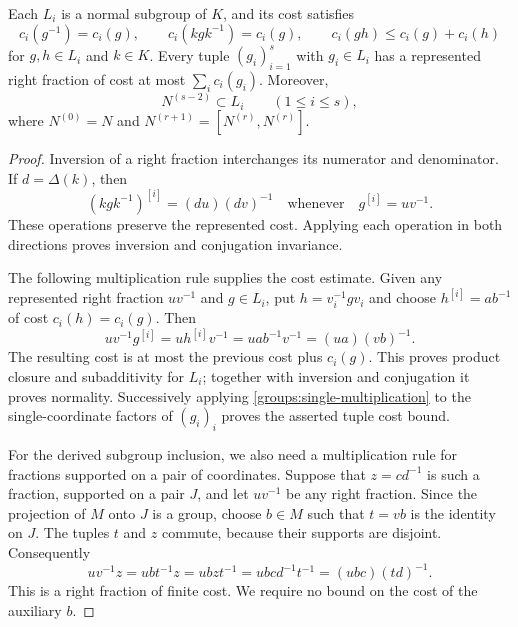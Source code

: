 \begin{lemma}\label{groups:fractions}
Each $L_i$ is a normal subgroup of $K$, and its cost satisfies
\[
 c_i(g^{-1})=c_i(g),\qquad
 c_i(kgk^{-1})=c_i(g),\qquad
 c_i(gh)\le c_i(g)+c_i(h)
\]
for $g,h\in L_i$ and $k\in K$.
Every tuple $(g_i)_{i=1}^s$ with $g_i\in L_i$ has a represented
right fraction of cost at most $\sum_i c_i(g_i)$.
Moreover,
\begin{equation}\label{groups:derived-inclusion}
 N^{(s-2)}\subset L_i\qquad(1\le i\le s),
\end{equation}
where $N^{(0)}=N$ and $N^{(r+1)}=[N^{(r)},N^{(r)}]$.
\end{lemma}
\begin{proof}
Inversion of a right fraction interchanges its numerator and denominator.
If $d=\Delta(k)$, then
\[
 (kgk^{-1})^{[i]}=(du)(dv)^{-1}
 \quad\text{whenever}\quad g^{[i]}=uv^{-1}.
\]
These operations preserve the represented cost.  Applying each operation
in both directions proves inversion and conjugation invariance.

The following multiplication rule supplies the cost estimate.  Given
any represented right fraction $uv^{-1}$ and $g\in L_i$, put
$h=v_i^{-1}gv_i$ and choose $h^{[i]}=ab^{-1}$ of cost $c_i(h)=c_i(g)$.
Then
\begin{equation}\label{groups:single-multiplication}
 uv^{-1}g^{[i]}
   =u h^{[i]}v^{-1}
   =ua b^{-1}v^{-1}
   =(ua)(vb)^{-1}.
\end{equation}
The resulting cost is at most the previous cost plus $c_i(g)$.
This proves product closure and subadditivity for $L_i$; together with
inversion and conjugation it proves normality.  Successively applying
\eqref{groups:single-multiplication} to the single-coordinate factors of
$(g_i)_i$ proves the asserted tuple cost bound.

For the derived subgroup inclusion, we also need a multiplication rule
for fractions supported on a pair of coordinates.  Suppose that
$z=cd^{-1}$ is such a fraction, supported on a pair $J$, and let
$uv^{-1}$ be any right fraction.  Since the projection of $M$ onto $J$
is a group, choose $b\in M$ such that $t=vb$ is the identity on $J$.
The tuples $t$ and $z$ commute, because their supports are disjoint.
Consequently
\begin{equation}\label{groups:pair-multiplication}
 uv^{-1}z
   =ubt^{-1}z
   =ubzt^{-1}
   =ubc d^{-1}t^{-1}
   =(ubc)(td)^{-1}.
\end{equation}
This is a right fraction of finite cost.  We require no bound on the
cost of the auxiliary $b$.


\end{proof}
